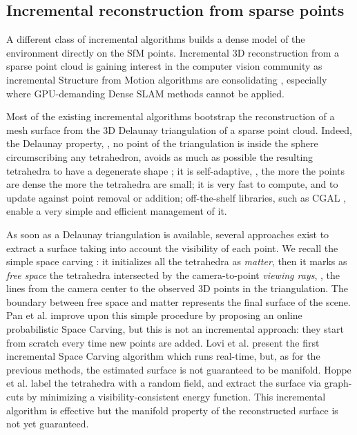 \subsection{Incremental reconstruction from sparse points}
A different class of incremental algorithms builds a dense model of the environment directly on the SfM points.
Incremental 3D reconstruction from a sparse point cloud is gaining interest in the computer vision community as incremental Structure from Motion algorithms are consolidating  \cite{wu13}, especially where GPU-demanding Dense SLAM methods cannot be applied. 

Most of the existing incremental algorithms \cite{lovi_et_al_11,Pan_et_al09,litvinov_lhuillier_13,litvinov_Lhiuller14} bootstrap the reconstruction of a mesh surface from the 3D Delaunay triangulation of a sparse point cloud. Indeed, the Delaunay property, \ie, no point of the triangulation is inside the sphere circumscribing any tetrahedron, avoids as much as possible the resulting tetrahedra to have a degenerate shape \cite{Maur_02}; it is self-adaptive, \ie, the more the points are dense the more the tetrahedra are small; it is very fast to compute, and to  update against point removal or addition; off-the-shelf libraries, such as CGAL \cite{cgal}, enable a very simple and efficient management of it. 

As soon as a Delaunay triangulation is available, several approaches exist to extract a surface taking into account the visibility of each point. 
We recall the simple space carving \cite{kutulakos_seitz05}: it initializes all the tetrahedra as \emph{matter}, then it marks as \emph{free space} the tetrahedra intersected by the camera-to-point \emph{viewing rays}, \ie, the lines from the camera center to the observed 3D points in the triangulation. 
The boundary between free space and matter represents the final surface of the scene.
Pan et al. \cite{Pan_et_al09} improve upon this simple procedure by proposing an online probabilistic Space Carving, but this is not an incremental approach: they start from scratch every time new points are added.
Lovi et al. \cite{lovi_et_al_11} present the first incremental Space Carving algorithm which runs real-time, but, as for the previous methods, the estimated surface is not guaranteed to be manifold.
 Hoppe et al. \cite{Hoppe13} label the tetrahedra with a random field, and extract the surface via graph-cuts by minimizing a visibility-consistent energy function. This incremental algorithm is effective but the manifold property of the reconstructed surface is not yet guaranteed.


